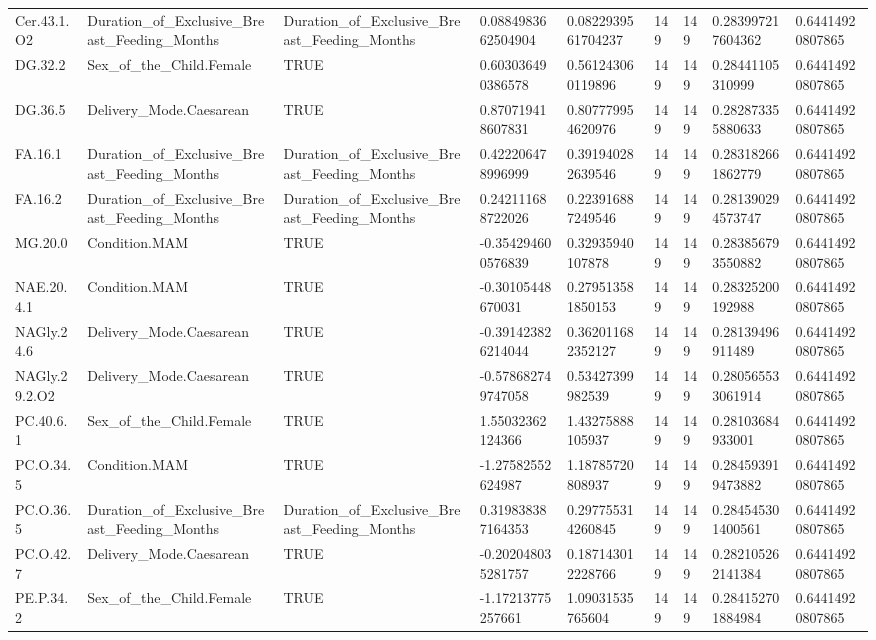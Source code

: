 \begin{longtable}{lllllllll}
Cer.43.1.O2 & Duration\_of\_Exclusive\_Breast\_Feeding\_Months & Duration\_of\_Exclusive\_Breast\_Feeding\_Months & 0.0884983662504904 & 0.0822939561704237 & 149 & 149 & 0.283997217604362 & 0.64414920807865 \\
DG.32.2 & Sex\_of\_the\_Child.Female & TRUE & 0.603036490386578 & 0.561243060119896 & 149 & 149 & 0.28441105310999 & 0.64414920807865 \\
DG.36.5 & Delivery\_Mode.Caesarean & TRUE & 0.870719418607831 & 0.807779954620976 & 149 & 149 & 0.282873355880633 & 0.64414920807865 \\
FA.16.1 & Duration\_of\_Exclusive\_Breast\_Feeding\_Months & Duration\_of\_Exclusive\_Breast\_Feeding\_Months & 0.422206478996999 & 0.391940282639546 & 149 & 149 & 0.283182661862779 & 0.64414920807865 \\
FA.16.2 & Duration\_of\_Exclusive\_Breast\_Feeding\_Months & Duration\_of\_Exclusive\_Breast\_Feeding\_Months & 0.242111688722026 & 0.223916887249546 & 149 & 149 & 0.281390294573747 & 0.64414920807865 \\
MG.20.0 & Condition.MAM & TRUE & -0.354294600576839 & 0.32935940107878 & 149 & 149 & 0.283856793550882 & 0.64414920807865 \\
NAE.20.4.1 & Condition.MAM & TRUE & -0.30105448670031 & 0.279513581850153 & 149 & 149 & 0.28325200192988 & 0.64414920807865 \\
NAGly.24.6 & Delivery\_Mode.Caesarean & TRUE & -0.391423826214044 & 0.362011682352127 & 149 & 149 & 0.28139496911489 & 0.64414920807865 \\
NAGly.29.2.O2 & Delivery\_Mode.Caesarean & TRUE & -0.578682749747058 & 0.53427399982539 & 149 & 149 & 0.280565533061914 & 0.64414920807865 \\
PC.40.6.1 & Sex\_of\_the\_Child.Female & TRUE & 1.55032362124366 & 1.43275888105937 & 149 & 149 & 0.28103684933001 & 0.64414920807865 \\
PC.O.34.5 & Condition.MAM & TRUE & -1.27582552624987 & 1.18785720808937 & 149 & 149 & 0.284593919473882 & 0.64414920807865 \\
PC.O.36.5 & Duration\_of\_Exclusive\_Breast\_Feeding\_Months & Duration\_of\_Exclusive\_Breast\_Feeding\_Months & 0.319838387164353 & 0.297755314260845 & 149 & 149 & 0.284545301400561 & 0.64414920807865 \\
PC.O.42.7 & Delivery\_Mode.Caesarean & TRUE & -0.202048035281757 & 0.187143012228766 & 149 & 149 & 0.282105262141384 & 0.64414920807865 \\
PE.P.34.2 & Sex\_of\_the\_Child.Female & TRUE & -1.17213775257661 & 1.09031535765604 & 149 & 149 & 0.284152701884984 & 0.64414920807865 \\

\end{longtable}
